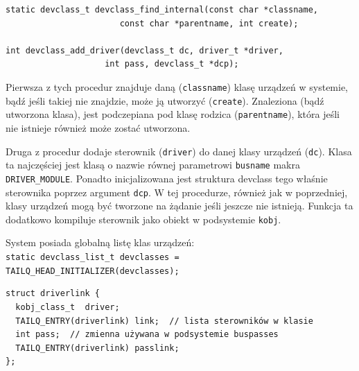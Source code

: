 \documentclass[shortabstract,inz]{iithesis}
\begin{document}
\begin{lstlisting}
static devclass_t devclass_find_internal(const char *classname, 
                       const char *parentname, int create);

int devclass_add_driver(devclass_t dc, driver_t *driver, 
                    int pass, devclass_t *dcp);
\end{lstlisting}



Pierwsza z tych procedur znajduje daną (\texttt{classname}) klasę urządzeń w systemie, bądź jeśli 
takiej nie znajdzie, może ją utworzyć (\texttt{create}). Znaleziona (bądź utworzona klasa),
jest podczepiana pod klasę rodzica (\texttt{parentname}), która jeśli nie istnieje również 
może zostać utworzona.



Druga z procedur dodaje sterownik (\texttt{driver}) do danej klasy urządzeń (\texttt{dc}).
Klasa ta najczęściej jest klasą o nazwie równej parametrowi \texttt{busname} makra 
\texttt{DRIVER\_MODULE}. Ponadto inicjalizowana jest struktura devclass 
tego właśnie sterownika poprzez argument \texttt{dcp}.
W tej procedurze, również jak w poprzedniej, klasy urządzeń mogą być tworzone na żądanie
jeśli jeszcze nie istnieją.
Funkcja ta dodatkowo kompiluje sterownik jako obiekt w podsystemie \texttt{kobj}.

System posiada globalną listę klas urządzeń:\\
\texttt{static devclass\_list\_t devclasses = TAILQ\_HEAD\_INITIALIZER(devclasses);}


\begin{lstlisting}[caption=Struktura driverlink]
struct driverlink {
  kobj_class_t  driver;
  TAILQ_ENTRY(driverlink) link;  // lista sterowników w klasie
  int pass;  // zmienna używana w podsystemie buspasses
  TAILQ_ENTRY(driverlink) passlink;
};
\end{lstlisting}
\end{document}
